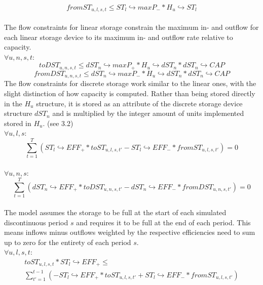 \documentclass[
	11pt,								%
	DIV10,								%
	a4paper,         					%
	oneside,							%
	headheight=20pt,					%
	footheight=20pt,					%
    parskip=full,						%
    listof=totoc,						%
	bibliography=totoc,					%
	index=totoc,						%
]{scrartcl}
\begin{document}
	\begin{equation}
		fromST_{u,l,s,t} \leq ST_l\hookrightarrow  maxP_{-} * H_u \hookrightarrow ST_l
	\end{equation}
	\\
	The flow constraints for linear storage constrain the maximum in- and outflow for each linear storage device to its maximum in- and outflow rate relative to capacity.
	\\
	$\forall u,n,s,t$:
	\begin{equation}
		toDST_{u,n,s,t} \leq dST_n\hookrightarrow  maxP_{+} * H_u \hookrightarrow dST_n * dST_n \hookrightarrow CAP
	\end{equation}
	\begin{equation}
		fromDST_{u,n,s,t} \leq dST_n\hookrightarrow  maxP_{-} * H_u \hookrightarrow dST_n * dST_n \hookrightarrow CAP
	\end{equation}
	The flow constraints for discrete storage work similar to the linear ones, with the slight distinction of how capacity is computed. Rather than being stored directly in the $H_u$ structure, it is stored as an attribute of the discrete storage device structure $dST_n$ and is multiplied by the integer amount of units implemented stored in $H_u$. (see 3.2)
	\\
	$\forall u,l,s$:
	\begin{equation}
		\sum_{t=1}^{T}(ST_l \hookrightarrow EFF_{+} * toST_{u,l,s,t'} - ST_l \hookrightarrow EFF_{-} * fromST_{u,l,s,t'}) = 0
	\end{equation}
	\\
	$\forall u,n,s$:
	\begin{equation}
		\sum_{t=1}^{T}(dST_n \hookrightarrow EFF_{+} * toDST_{u,n,s,t'} - dST_n \hookrightarrow EFF_{-} * fromDST_{u,n,s,t'}) = 0
	\end{equation}
	\\
	The model assumes the storage to be full at the start of each simulated discontinuous period $s$ and requires it to be full at the end of each period. This means inflows minus outflows weighted by the respective efficiencies need to sum up to zero for the entirety of each period $s$.
	\\
	$\forall u,l,s,t$:
	\begin{equation}
		\begin{split}
		toST_{u,l,s,t} * ST_l \hookrightarrow EFF_{+} \leq \\
		\sum_{t'=1}^{t-1}(-ST_l \hookrightarrow EFF_{+} * toST_{u,l,s,t'} + ST_l \hookrightarrow EFF_{-} * fromST_{u,l,s,t'})
		\end{split}
	\end{equation}
\end{document}
